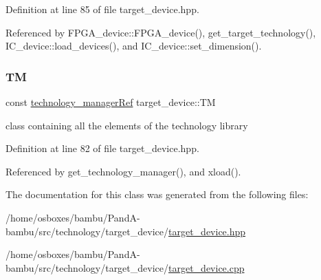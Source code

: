 Definition at line 85 of file target\+\_\+device.\+hpp.



Referenced by F\+P\+G\+A\+\_\+device\+::\+F\+P\+G\+A\+\_\+device(), get\+\_\+target\+\_\+technology(), I\+C\+\_\+device\+::load\+\_\+devices(), and I\+C\+\_\+device\+::set\+\_\+dimension().

\mbox{\label{classtarget__device_a941853b670a1b34eae7eab6bd21c854a}} 
\subsubsection{\texorpdfstring{TM}{TM}}
{\footnotesize\ttfamily const \hyperlink{technology__manager_8hpp_a4b9ecd440c804109c962654f9227244e}{technology\+\_\+manager\+Ref} target\+\_\+device\+::\+TM\hspace{0.3cm}{\ttfamily [protected]}}



class containing all the elements of the technology library 



Definition at line 82 of file target\+\_\+device.\+hpp.



Referenced by get\+\_\+technology\+\_\+manager(), and xload().



The documentation for this class was generated from the following files\+:\begin{DoxyCompactItemize}
\item 
/home/osboxes/bambu/\+Pand\+A-\/bambu/src/technology/target\+\_\+device/\hyperlink{target__device_8hpp}{target\+\_\+device.\+hpp}\item 
/home/osboxes/bambu/\+Pand\+A-\/bambu/src/technology/target\+\_\+device/\hyperlink{target__device_8cpp}{target\+\_\+device.\+cpp}\end{DoxyCompactItemize}
